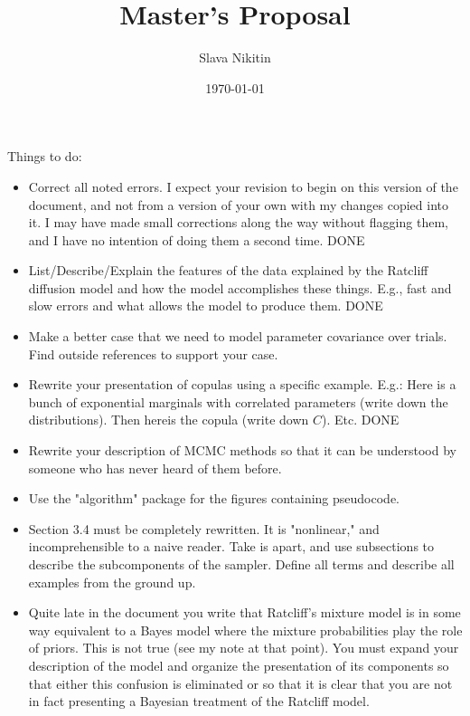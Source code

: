 \documentclass[12pt]{article}
\title{Master's Proposal}
\author{Slava Nikitin}
\date{\today}
\begin{document}
\maketitle

\tableofcontents

\listoftodos

Things to do:
\begin{itemize}
\item Correct all noted errors.  I expect your revision to begin on
      this version of the document, and not from a version of your own with
      my changes copied into it.  I may have made small corrections along
      the way without flagging them, and I have no intention of doing them a
      second time.
      DONE
\item List/Describe/Explain the features of the data explained by the
      Ratcliff diffusion model and how the model accomplishes these things.
      E.g., fast and slow errors and what allows the model to produce them.
      DONE
\item Make a better case that we need to model parameter covariance over 
      trials.  Find outside references to support your case.
\item Rewrite your presentation of copulas using a specific example.
      E.g.: Here is a bunch of exponential marginals with correlated
      parameters (write down the distributions).  Then hereis the copula
      (write down $C$).  Etc.
      DONE
\item Rewrite your description of MCMC methods so that it can be
      understood by someone who has never heard of them before.
\item Use the "algorithm" package for the figures containing pseudocode.
\item Section 3.4 must be completely rewritten.  It is "nonlinear,"
      and incomprehensible to a naive reader.  Take is apart, and use
      subsections to describe the subcomponents of the sampler.  Define all
      terms and describe all examples from the ground up.
\item Quite late in the document you write that Ratcliff's mixture
      model is in some way equivalent to a Bayes model where the mixture
      probabilities play the role of priors.  This is not true (see my note
      at that point).  You must expand your description of the model and
      organize the presentation of its components so that either this
      confusion is eliminated or so that it is clear that you are not in
      fact presenting a Bayesian treatment of the Ratcliff model.


\end{itemize}
\end{document}

